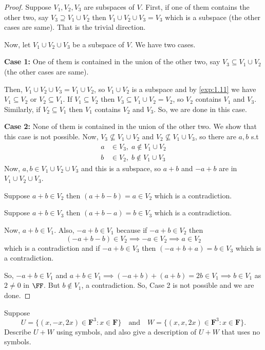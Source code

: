 \begin{proof}
Suppose $V_1, V_2, V_3$ are subspaces of $V$. First, if one of them contains the other two, say $V_3 \supseteq V_1 \cup V_2$ then $V_1 \cup V_2 \cup V_3 = V_3$ which is a subspace (the other cases are same). That is the trivial direction.

Now, let $V_1 \cup V_2 \cup V_3$ be a subspace of $V$. We have two cases.

\textbf{Case 1:} One of them is contained in the union of the other two, say $V_3 \subseteq V_1 \cup V_2$ (the other cases are same).

Then, $V_1 \cup V_2 \cup V_3 = V_1 \cup V_2$, so $V_1 \cup V_2$ is a subspace and by \ref{exp:1.11} we have $V_1 \subseteq V_2$ or $V_2 \subseteq V_1$. If $V_1 \subseteq V_2$ then $V_3 \subseteq V_1 \cup V_2 = V_2$, so $V_2$ contains $V_1$ and $V_3$. Similarly, if $V_2 \subseteq V_1$ then $V_1$ contains $V_2$ and $V_3$. So, we are done in this case.

\textbf{Case 2:} None of them is contained in the union of the other two. We show that this case is not possible. Now, $V_3 \not\subseteq V_1 \cup V_2$ and $V_2 \not\subseteq V_1 \cup V_3$, so there are $a, b$ s.t
\begin{align*}
a &\in V_3, \; a \notin V_1 \cup V_2 \\
b &\in V_2, \; b \notin V_1 \cup V_3
\end{align*}
Now, $a, b \in V_1 \cup V_2 \cup V_3$ and this is a subspace, so $a+b$ and $-a+b$ are in $V_1 \cup V_2 \cup V_3$.

Suppose $a+b \in V_2$ then $(a+b-b) = a \in V_2$ which is a contradiction.

Suppose $a+b \in V_3$ then $(a+b-a) = b \in V_3$ which is a contradiction.

Now, $a+b \in V_1$. Also, $-a+b \in V_1$ because if $-a+b \in V_2$ then
\[
(-a+b-b) \in V_2 \implies -a \in V_2 \implies a \in V_2
\]
which is a contradiction and if $-a+b \in V_3$ then $(-a+b+a) = b \in V_3$ which is a contradiction.

So, $-a+b \in V_1$ and $a+b \in V_1 \implies (-a+b)+(a+b) = 2b \in V_1 \implies b \in V_1$ as $2 \neq 0$ in $\FF$. But $b \notin V_1$, a contradiction. So, Case 2 is not possible and we are done.
\end{proof}

\begin{exercise}
Suppose
\[
U = \{(x, -x, 2x) \in \mathbf{F}^3 : x \in \mathbf{F}\} \quad \text{and} \quad W = \{(x, x, 2x) \in \mathbf{F}^3 : x \in \mathbf{F}\}.
\]
Describe $U + W$ using symbols, and also give a description of $U + W$ that uses no symbols.
\end{exercise}

